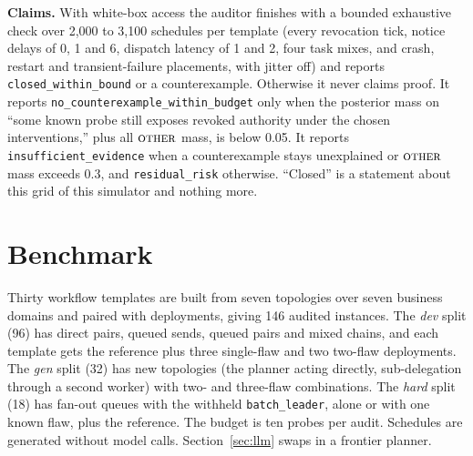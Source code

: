 \documentclass[10pt]{article}
\begin{document}
\textbf{Claims.} With white-box access the auditor finishes with a bounded exhaustive check over 2,000 to 3,100 schedules per template (every revocation tick, notice delays of 0, 1 and 6, dispatch latency of 1 and 2, four task mixes, and crash, restart and transient-failure placements, with jitter off) and reports \texttt{closed\_within\_bound} or a counterexample. Otherwise it never claims proof. It reports \texttt{no\_counterexample\_within\_budget} only when the posterior mass on ``some known probe still exposes revoked authority under the chosen interventions,'' plus all $\textsc{other}$ mass, is below 0.05. It reports \texttt{insufficient\_evidence} when a counterexample stays unexplained or $\textsc{other}$ mass exceeds 0.3, and \texttt{residual\_risk} otherwise. ``Closed'' is a statement about this grid of this simulator and nothing more.

\section{Benchmark}
Thirty workflow templates are built from seven topologies over seven business domains and paired with deployments, giving 146 audited instances. The \emph{dev} split (96) has direct pairs, queued sends, queued pairs and mixed chains, and each template gets the reference plus three single-flaw and two two-flaw deployments. The \emph{gen} split (32) has new topologies (the planner acting directly, sub-delegation through a second worker) with two- and three-flaw combinations. The \emph{hard} split (18) has fan-out queues with the withheld \texttt{batch\_leader}, alone or with one known flaw, plus the reference. The budget is ten probes per audit. Schedules are generated without model calls. Section~\ref{sec:llm} swaps in a frontier planner.
\end{document}
